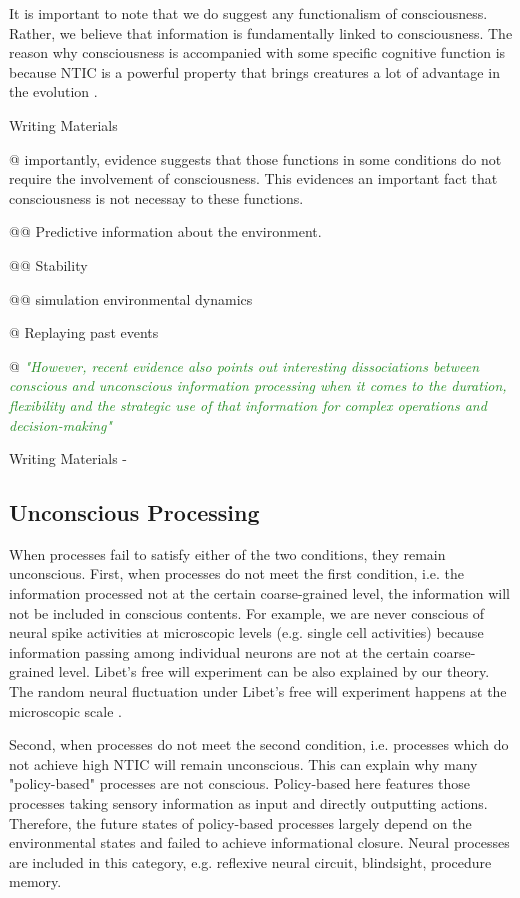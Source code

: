\documentclass[utf8]{article}
\newenvironment{WritingMaterials} %
    	{
            \begin{tcolorbox}[enhanced,
                title=-,
                size=small,
                colbacktitle=Aquamarine,
                drop fuzzy shadow,
                fontupper=\small,
                boxrule=0.4pt,
                colback=Aquamarine!10!white,
                sharp corners]
                Writing Materials
            \end{tcolorbox}
            \begin{easylist}[itemize]
    	}
    	{
            \end{easylist}  
            \begin{tcolorbox}[enhanced,
                halign=flush right,
                halign title=right,
                size=small,
                colbacktitle=Aquamarine,
                drop fuzzy shadow,
                fontupper=\small,
                boxrule=0.4pt,
                colback=Aquamarine,
                colupper=White,
                sharp corners]
                Writing Materials -
            \end{tcolorbox}        
    	}
\newcommand{\rewrite}[1]{\textcolor{ForestGreen}{\textit{"#1"}}\newline}
\begin{document}
		It is important to note that we do suggest any functionalism of consciousness. Rather, we believe that information is fundamentally linked to consciousness. The reason why consciousness is accompanied with some specific cognitive function is because NTIC is a powerful property that brings creatures a lot of advantage in the evolution \cite{Seth2009Encyclopediaofconsciousness}. 
		 
	    \begin{WritingMaterials}
	        @ importantly, evidence suggests that those functions in some conditions do not require the involvement of consciousness. This evidences an important fact that consciousness is not necessay to these functions. 
	        
	        
	        @@ Predictive information about the environment.
	        
	        @@ Stability 
	        
	        @@ simulation environmental dynamics 
	        
	        @ Replaying past events
	        
	        @ \rewrite{However, recent evidence also points out interesting dissociations between conscious and unconscious information processing when it comes to the duration, flexibility and the strategic use of that information for complex operations and decision-making} \cite{van2012role}
	        
	    \end{WritingMaterials}
	    
	    
		
		\subsection{Unconscious Processing}
		When processes fail to satisfy either of the two conditions, they remain unconscious. First, when processes do not meet the first condition, i.e. the information processed not at the certain coarse-grained level, the information will not be included in conscious contents. For example, we are never conscious of neural spike activities at microscopic levels (e.g. single cell activities) because information passing among individual neurons are not at the certain coarse-grained level. Libet's free will experiment can be also explained by our theory. The random neural fluctuation under Libet's free will experiment happens at the microscopic scale \citep{SchurgerE2904}. 
		
		Second, when processes do not meet the second condition, i.e. processes which do not achieve high NTIC will remain unconscious. This can explain why many "policy-based" processes are not conscious. Policy-based here features those processes taking sensory information as input and directly outputting actions. Therefore, the future states of policy-based processes largely depend on the environmental states and failed to achieve informational closure. Neural processes are included in this category, e.g. reflexive neural circuit, blindsight, procedure memory. 
		
\end{document}
